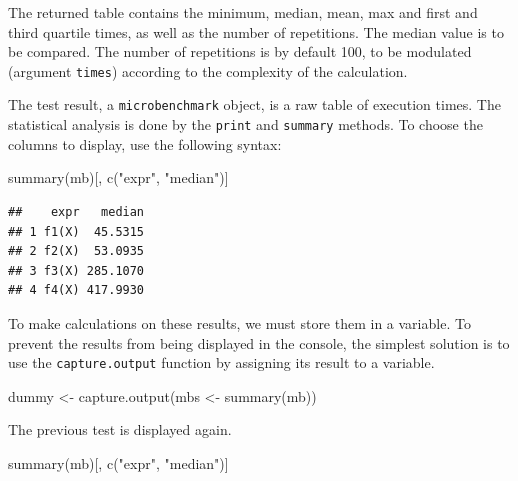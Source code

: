 \documentclass[
  12pt,
  american,
  a4paper,
  extrafontsizes,onecolumn,openright
  ]{memoir}
\newenvironment{Shaded}{\begin{snugshade}}{\end{snugshade}}
\newcommand{\FunctionTok}[1]{\textcolor[rgb]{0.00,0.00,0.00}{#1}}
\newcommand{\NormalTok}[1]{#1}
\newcommand{\OtherTok}[1]{\textcolor[rgb]{0.56,0.35,0.01}{#1}}
\newcommand{\StringTok}[1]{\textcolor[rgb]{0.31,0.60,0.02}{#1}}
\begin{document}
\normalsize

The returned table contains the minimum, median, mean, max and first and third quartile times, as well as the number of repetitions.
The median value is to be compared.
The number of repetitions is by default 100, to be modulated (argument \texttt{times}) according to the complexity of the calculation.

The test result, a \texttt{microbenchmark} object, is a raw table of execution times.
The statistical analysis is done by the \texttt{print} and \texttt{summary} methods.
To choose the columns to display, use the following syntax:

\scriptsize

\begin{Shaded}
\begin{Highlighting}[]
\FunctionTok{summary}\NormalTok{(mb)[, }\FunctionTok{c}\NormalTok{(}\StringTok{"expr"}\NormalTok{, }\StringTok{"median"}\NormalTok{)]}
\end{Highlighting}
\end{Shaded}

\begin{verbatim}
##    expr   median
## 1 f1(X)  45.5315
## 2 f2(X)  53.0935
## 3 f3(X) 285.1070
## 4 f4(X) 417.9930
\end{verbatim}

\normalsize

To make calculations on these results, we must store them in a variable.
To prevent the results from being displayed in the console, the simplest solution is to use the \texttt{capture.output} function by assigning its result to a variable.

\scriptsize

\begin{Shaded}
\begin{Highlighting}[]
\NormalTok{dummy }\OtherTok{\textless{}{-}} \FunctionTok{capture.output}\NormalTok{(mbs }\OtherTok{\textless{}{-}} \FunctionTok{summary}\NormalTok{(mb))}
\end{Highlighting}
\end{Shaded}

\normalsize

The previous test is displayed again.

\scriptsize

\begin{Shaded}
\begin{Highlighting}[]
\FunctionTok{summary}\NormalTok{(mb)[, }\FunctionTok{c}\NormalTok{(}\StringTok{"expr"}\NormalTok{, }\StringTok{"median"}\NormalTok{)]}
\end{Highlighting}
\end{Shaded}
\end{document}
